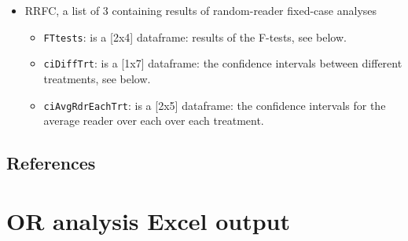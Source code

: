 \documentclass[
]{book}
\newenvironment{Shaded}{\begin{snugshade}}{\end{snugshade}}
\newcommand{\CommentTok}[1]{\textcolor[rgb]{0.56,0.35,0.01}{\textit{#1}}}
\newcommand{\NormalTok}[1]{#1}
\newcommand{\OperatorTok}[1]{\textcolor[rgb]{0.81,0.36,0.00}{\textbf{#1}}}
\providecommand{\tightlist}{%
  \setlength{\itemsep}{0pt}\setlength{\parskip}{0pt}}
\begin{document}
\begin{itemize}
\tightlist
\item
  RRFC, a list of 3 containing results of random-reader fixed-case analyses

  \begin{itemize}
  \tightlist
  \item
    \texttt{FTtests}: is a {[}2x4{]} dataframe: results of the F-tests, see below.
  \item
    \texttt{ciDiffTrt}: is a {[}1x7{]} dataframe: the confidence intervals between different treatments, see below.
  \item
    \texttt{ciAvgRdrEachTrt}: is a {[}2x5{]} dataframe: the confidence intervals for the average reader over each over each treatment.
  \end{itemize}
\end{itemize}

\begin{Shaded}
\end{Shaded}

\hypertarget{quick-start-or-text-references}{%
\section{References}\label{quick-start-or-text-references}}

\hypertarget{quick-start-or-excel}{%
\chapter{OR analysis Excel output}\label{quick-start-or-excel}}
\end{document}
